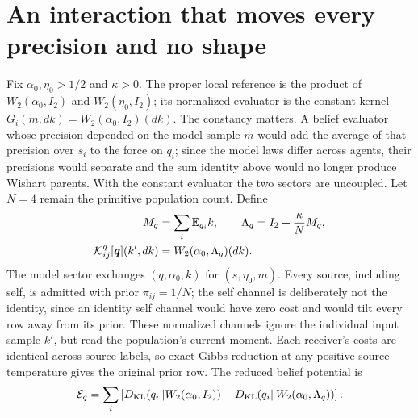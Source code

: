 \section{An interaction that moves every precision and no shape}
\label{cf:flow}

Fix $\alpha_0,\eta_0>1/2$ and $\kappa>0$. The proper local reference is the product of $W_2(\alpha_0,I_2)$ and $W_2(\eta_0,I_2)$; its normalized evaluator is the constant kernel $G_i(m,dk)=W_2(\alpha_0,I_2)(dk)$. The constancy matters. A belief evaluator whose precision depended on the model sample $m$ would add the average of that precision over $s_i$ to the force on $q_i$; since the model laws differ across agents, their precisions would separate and the sum identity above would no longer produce Wishart parents. With the constant evaluator the two sectors are uncoupled. Let $N=4$ remain the primitive population count. Define
\begin{equation}
 \begin{aligned}
 M_q&=\sum_i\mathbb E_{q_i}k,
 \qquad \Lambda_q=I_2+\frac\kappa N M_q,\\
 \mathcal K^q_{ij}[\boldsymbol q](k',dk)
 &=W_2(\alpha_0,\Lambda_q)(dk).
 \end{aligned}
 \label{cf:channel}
\end{equation}
The model sector exchanges $(q,\alpha_0,k)$ for $(s,\eta_0,m)$. Every source, including self, is admitted with prior $\pi_{ij}=1/N$; the self channel is deliberately not the identity, since an identity self channel would have zero cost and would tilt every row away from its prior. These normalized channels ignore the individual input sample $k'$, but read the population's current moment. Each receiver's costs are identical across source labels, so exact Gibbs reduction at any positive source temperature gives the original prior row. The reduced belief potential is
\begin{equation}
 \mathcal E_q=\sum_i\left[
 D_{\mathrm{KL}}(q_i\Vert W_2(\alpha_0,I_2))
 +D_{\mathrm{KL}}(q_i\Vert W_2(\alpha_0,\Lambda_q))\right].
\end{equation}

